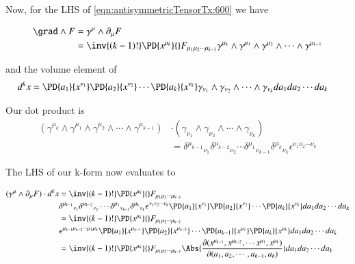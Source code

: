 Now, for the LHS of \ref{eqn:antisymmetricTensorTx:600} we have

\begin{align*}
\grad \wedge F 
&=
\gamma^\mu \wedge \partial_\mu F \\
&=
\inv{(k-1)!}\PD{x^{\mu_k}}{} F_{\mu_1 \mu_2 \cdots \mu_{k-1}}
\gamma^{\mu_k} \wedge
\gamma^{\mu_1} \wedge \gamma^{ \mu_2 } \wedge \cdots \wedge \gamma^{\mu_{k-1}} 
\end{align*}

and the volume element of
\begin{align*}
d^k x 
&=
\PD{a_1}{x^{\nu_1}}
\PD{a_2}{x^{\nu_2}}
\cdots
\PD{a_k}{x^{\nu_{k}}}
\gamma_{\nu_1} \wedge \gamma_{ \nu_2 } \wedge \cdots \wedge \gamma_{\nu_k}
da_1 da_2 \cdots da_k
\end{align*}

Our dot product is
\begin{equation}\label{eqn:antisymmetricTensorTx:630}
\begin{aligned}
\left(\gamma^{\mu_k} \wedge
\gamma^{\mu_1} \wedge \gamma^{ \mu_2 } \wedge \cdots \wedge \gamma^{\mu_{k-1}} \right) & \cdot
\left( \gamma_{\nu_1} \wedge \gamma_{ \nu_2 } \wedge \cdots \wedge \gamma_{\nu_k} \right) \\
&=
{\delta^{\mu_{k-1}}}_{\nu_1}  {\delta^{ \mu_{k-2} }}_{\nu_2}  \cdots  
{\delta^{\mu_{1}} }_{\nu_{k-1}}
{\delta^{\mu_{k}} }_{\nu_{k}}
\epsilon^{\nu_1 \nu_2 \cdots \nu_{k}}
\end{aligned}
\end{equation}

The LHS of our k-form now evaluates to

\begin{align*}
(\gamma^\mu \wedge \partial_\mu F) \cdot d^k x 
&=
\inv{(k-1)!}\PD{x^{\mu_k}}{} F_{\mu_1 \mu_2 \cdots \mu_{k-1}} \\
&{\delta^{\mu_{k-1}}}_{\nu_1}  {\delta^{ \mu_{k-2} }}_{\nu_2}  \cdots  
{\delta^{\mu_{1}} }_{\nu_{k-1}}
{\delta^{\mu_{k}} }_{\nu_{k}}
\epsilon^{\nu_1 \nu_2 \cdots \nu_{k}}
\PD{a_1}{x^{\nu_1}}
\PD{a_2}{x^{\nu_2}}
\cdots
\PD{a_k}{x^{\nu_{k}}}
da_1 da_2 \cdots da_k \\
&=
\inv{(k-1)!}\PD{x^{\mu_k}}{} F_{\mu_1 \mu_2 \cdots \mu_{k-1}} \\
&\epsilon^{\mu_{k-1} \mu_{k-2} \cdots \mu_1 \mu_{k}}
\PD{a_1}{x^{\mu_{k-1}}}
\PD{a_2}{x^{\mu_{k-2}}}
\cdots
\PD{a_{k-1}}{x^{\mu_{1}}}
\PD{a_k}{x^{\mu_{k}}}
da_1 da_2 \cdots da_k \\
&=
\inv{(k-1)!}\PD{x^{\mu_k}}{} F_{\mu_1 \mu_2 \cdots \mu_{k-1}}
\Abs{\frac{\partial(
x^{\mu_{k-1}},
x^{\mu_{k-2}},
\cdots
x^{\mu_{1}},
x^{\mu_{k}}
)}{\partial(a_1, a_2, \cdots, a_{k-1}, a_k)}
}
da_1 da_2 \cdots da_k \\
\end{align*}

